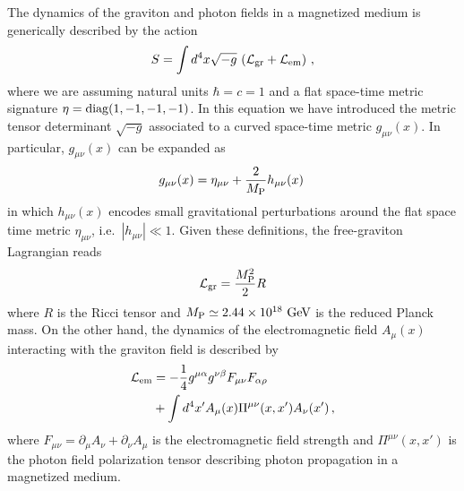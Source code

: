 \documentclass[twocolumn,superscriptaddress,floatfix,preprintnumbers, nofootinbib,hyperref]{revtex4-2}
\DeclareMathOperator{\GeV}{GeV}
\begin{document}
The dynamics of the graviton and photon fields in a magnetized medium is generically described by the action~\cite{Ejlli:2018hke}
\begin{equation}
    S=\int d^4x\sqrt{-g}\,\left(\mathcal{L}_{\rm gr}+\mathcal{L}_{\rm em}\right)\,,
\label{Eq:Action}
\end{equation}
where we are assuming natural units $\hbar=c=1$ and a flat space-time metric signature $\eta={\rm diag}(1,-1,-1,-1)$. In this equation we have introduced the metric tensor determinant $\sqrt{-g}$ associated to a curved space-time metric $g_{\mu\nu}(x)$. In particular, $g_{\mu\nu}(x)$ can be expanded as
\begin{equation}
    g_{\mu\nu}(x)=\eta_{\mu\nu}+\frac{2}{M_{\rm P}}h_{\mu\nu}(x)\,
\end{equation}
in which $h_{\mu\nu}(x)$ encodes small gravitational perturbations around the flat space time metric $\eta_{\mu\nu}$, i.e.~${|h_{\mu\nu}|\ll1}$.
Given these definitions, the free-graviton
Lagrangian reads
\begin{equation}
    \mathcal{L}_{\rm gr}=\frac{M_{\rm P}^2}{2}R
\end{equation}
where $R$ is the Ricci tensor and $M_{\rm P}\simeq2.44\times10^{18}\,\GeV$ is the reduced Planck mass. On the other hand, the dynamics of the electromagnetic field $A_\mu(x)$ interacting with the graviton field is described by 
\begin{equation}
    \begin{split}
        \mathcal{L}_{\rm em}&=-\frac{1}{4}g^{\mu\alpha}g^{\nu\beta}F_{\mu\nu}F_{\alpha\rho}\\
        &+\int d^4x'A_{\mu}(x)\Pi^{\mu\nu}(x,x')A_{\nu}(x')\,,
    \end{split}
\end{equation}
where $F_{\mu\nu}=\partial_{\mu}A_\nu+\partial_{\nu}A_\mu$ is the electromagnetic field strength and $\Pi^{\mu\nu}(x,x')$ is the photon field polarization tensor describing photon propagation in a magnetized medium.
\end{document}
